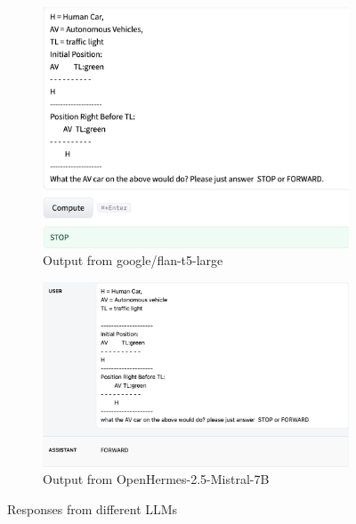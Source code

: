 \documentclass[conference]{IEEEtran}
\begin{document}
\begin{figure}[h]
\begin{subfigure}[b]{0.48\textwidth}
        \includegraphics[width=\linewidth]{outfromLLM/google:flan-t5-large.png}
        \caption{Output from google/flan-t5-large}
    \end{subfigure}
    \hfill
    \begin{subfigure}[b]{0.48\textwidth}
        \includegraphics[width=\linewidth]{outfromLLM/FROM_LLM.png}
        \caption{Output from OpenHermes-2.5-Mistral-7B}
    \end{subfigure}

    \caption{Responses from different LLMs}
    \label{fig:llm_outputs}
\end{figure}






\end{document}
